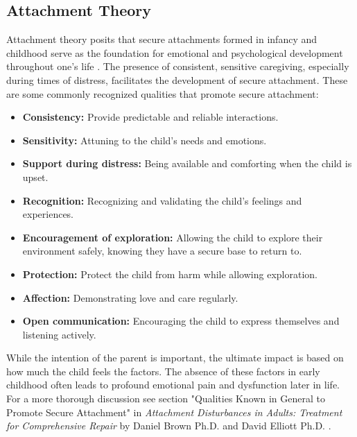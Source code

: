\documentclass[12pt,letterpaper]{article}
\begin{document}
\subsection{Attachment Theory}
\label{attachment}
Attachment theory posits that secure attachments formed in infancy and childhood serve as the foundation for emotional and psychological development throughout one's life \cite{brownAttachmentDisturbances}. The presence of consistent, sensitive caregiving, especially during times of distress, facilitates the development of secure attachment. These are some commonly recognized qualities that promote secure attachment:
\begin{itemize}
    \item \textbf{Consistency:} Provide predictable and reliable interactions.
    \item \textbf{Sensitivity:} Attuning to the child's needs and emotions.
    \item \textbf{Support during distress:} Being available and comforting when the child is upset.
    \item \textbf{Recognition:} Recognizing and validating the child's feelings and experiences.
    \item \textbf{Encouragement of exploration:} Allowing the child to explore their environment safely, knowing they have a secure base to return to.
    \item \textbf{Protection:} Protect the child from harm while allowing exploration.
    \item \textbf{Affection:} Demonstrating love and care regularly.
    \item \textbf{Open communication:} Encouraging the child to express themselves and listening actively.
\end{itemize}
While the intention of the parent is important, the ultimate impact is based on how much the child feels the factors. The absence of these factors in early childhood often leads to profound emotional pain and dysfunction later in life. For a more thorough discussion see section "Qualities Known in General to Promote Secure Attachment" in \textit{Attachment Disturbances in Adults: Treatment for Comprehensive Repair} by Daniel Brown Ph.D. and David Elliott Ph.D. \cite{brownAttachmentDisturbances}.
\end{document}
